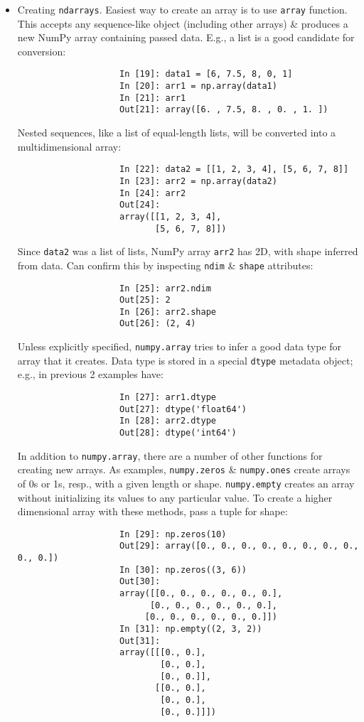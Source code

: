 \documentclass{article}
\begin{document}
\begin{enumerate}
\begin{itemize}
\begin{itemize}
			\begin{itemize}
				\item {\sf Creating {\tt ndarrays}.} Easiest way to create an array is to use {\tt array} function. This accepts any sequence-like object (including other arrays) \& produces a new NumPy array containing passed data. E.g., a list is a good candidate for conversion:
				\begin{verbatim}
					In [19]: data1 = [6, 7.5, 8, 0, 1]
					In [20]: arr1 = np.array(data1)
					In [21]: arr1
					Out[21]: array([6. , 7.5, 8. , 0. , 1. ])
				\end{verbatim}
				Nested sequences, like a list of equal-length lists, will be converted into a multidimensional array:
				\begin{verbatim}
					In [22]: data2 = [[1, 2, 3, 4], [5, 6, 7, 8]]
					In [23]: arr2 = np.array(data2)
					In [24]: arr2
					Out[24]:
					array([[1, 2, 3, 4],
					       [5, 6, 7, 8]])
				\end{verbatim}
				Since {\tt data2} was a list of lists, NumPy array {\tt arr2} has 2D, with shape inferred from data. Can confirm this by inspecting {\tt ndim} \& {\tt shape} attributes:
				\begin{verbatim}
					In [25]: arr2.ndim
					Out[25]: 2
					In [26]: arr2.shape
					Out[26]: (2, 4)
				\end{verbatim}
				Unless explicitly specified, {\tt numpy.array} tries to infer a good data type for array that it creates. Data type is stored in a special {\tt dtype} metadata object; e.g., in previous 2 examples have:
				\begin{verbatim}
					In [27]: arr1.dtype
					Out[27]: dtype('float64')
					In [28]: arr2.dtype
					Out[28]: dtype('int64')
				\end{verbatim}
				In addition to {\tt numpy.array}, there are a number of other functions for creating new arrays. As examples, {\tt numpy.zeros} \& {\tt numpy.ones} create arrays of 0s or 1s, resp., with a given length or shape. {\tt numpy.empty} creates an array without initializing its values to any particular value. To create a higher dimensional array with these methods, pass a tuple for shape:
				\begin{verbatim}
					In [29]: np.zeros(10)
					Out[29]: array([0., 0., 0., 0., 0., 0., 0., 0., 0., 0.])
					In [30]: np.zeros((3, 6))
					Out[30]:
					array([[0., 0., 0., 0., 0., 0.],
					      [0., 0., 0., 0., 0., 0.],
					     [0., 0., 0., 0., 0., 0.]])
					In [31]: np.empty((2, 3, 2))
					Out[31]:
					array([[[0., 0.],
					        [0., 0.],
					        [0., 0.]],
					       [[0., 0.],
					        [0., 0.],
					        [0., 0.]]])
				\end{verbatim}
				

\end{itemize}
\end{itemize}
\end{itemize}
\end{enumerate}
\end{document}
